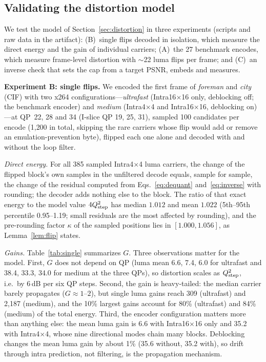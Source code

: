 \subsection{Validating the distortion model}
\label{sec:eval-distortion}

We test the model of Section~\ref{sec:distortion} in three experiments (scripts and raw data in the artifact): (B)~single flips decoded in isolation, which measure the direct energy and the gain of individual carriers; (A)~the 27 benchmark encodes, which measure frame-level distortion with $\sim$22 luma flips per frame; and (C)~an inverse check that sets the cap from a target PSNR, embeds and measures.

\textbf{Experiment B: single flips.} We encoded the first frame of \emph{foreman} and \emph{city} (CIF) with two x264 configurations---\emph{ultrafast} (Intra16$\times$16 only, deblocking off; the benchmark encoder) and \emph{medium} (Intra4$\times$4 and Intra16$\times$16, deblocking on)---at QP~22, 28 and 34 (I-slice QP 19, 25, 31), sampled 100 candidates per encode (1{,}200 in total, skipping the rare carriers whose flip would add or remove an emulation-prevention byte), flipped each one alone and decoded with and without the loop filter.

\emph{Direct energy.} For all 385 sampled Intra4$\times$4 luma carriers, the change of the flipped block's own samples in the unfiltered decode equals, sample for sample, the change of the residual computed from Eqs.~\eqref{eq:dequant} and~\eqref{eq:inverse} with rounding; the decoder adds nothing else to the block. The ratio of that exact energy to the model value $4Q_{\mathrm{step}}^2$ has median $1.012$ and mean $1.022$ (5th--95th percentile 0.95--1.19; small residuals are the most affected by rounding), and the pre-rounding factor $\kappa$ of the sampled positions lies in $[1.000,1.056]$, as Lemma~\ref{lem:flip} states.

\emph{Gains.} Table~\ref{tab:single} summarizes $G$. Three observations matter for the model. First, $G$ does not depend on QP (luma mean 6.6, 7.4, 6.0 for ultrafast and 38.4, 33.3, 34.0 for medium at the three QPs), so distortion scales as $Q_{\mathrm{step}}^2$, i.e.\ by 6\,dB per six QP steps. Second, the gain is heavy-tailed: the median carrier barely propagates ($G\approx1$--$2$), but single luma gains reach 309 (ultrafast) and 2{,}187 (medium), and the 10\% largest gains account for 80\% (ultrafast) and 84\% (medium) of the total energy. Third, the encoder configuration matters more than anything else: the mean luma gain is 6.6 with Intra16$\times$16 only and 35.2 with Intra4$\times$4, whose nine directional modes chain many blocks. Deblocking changes the mean luma gain by about 1\% (35.6 without, 35.2 with), so drift through intra prediction, not filtering, is the propagation mechanism.

